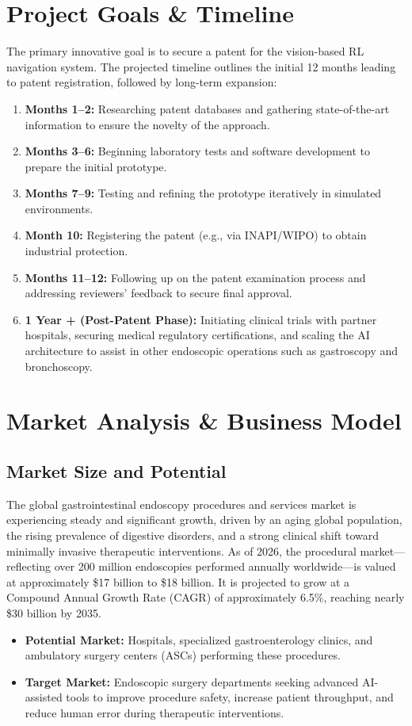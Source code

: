 \section{Project Goals \& Timeline}
The primary innovative goal is to secure a patent for the vision-based RL navigation system. The projected timeline outlines the initial 12 months leading to patent registration, followed by long-term expansion:
\begin{enumerate}
    \item \textbf{Months 1--2:} Researching patent databases and gathering state-of-the-art information to ensure the novelty of the approach.
    \item \textbf{Months 3--6:} Beginning laboratory tests and software development to prepare the initial prototype.
    \item \textbf{Months 7--9:} Testing and refining the prototype iteratively in simulated environments.
    \item \textbf{Month 10:} Registering the patent (e.g., via INAPI/WIPO) to obtain industrial protection.
    \item \textbf{Months 11--12:} Following up on the patent examination process and addressing reviewers' feedback to secure final approval.
    \item \textbf{1 Year + (Post-Patent Phase):} Initiating clinical trials with partner hospitals, securing medical regulatory certifications, and scaling the AI architecture to assist in other endoscopic operations such as gastroscopy and bronchoscopy.
\end{enumerate}

\section{Market Analysis \& Business Model}
\subsection{Market Size and Potential}
The global gastrointestinal endoscopy procedures and services market is experiencing steady and significant growth, driven by an aging global population, the rising prevalence of digestive disorders, and a strong clinical shift toward minimally invasive therapeutic interventions. As of 2026, the procedural market—reflecting over 200 million endoscopies performed annually worldwide—is valued at approximately \$17 billion to \$18 billion. It is projected to grow at a Compound Annual Growth Rate (CAGR) of approximately 6.5\%, reaching nearly \$30 billion by 2035. 
\begin{itemize}
    \item \textbf{Potential Market:} Hospitals, specialized gastroenterology clinics, and ambulatory surgery centers (ASCs) performing these procedures.
    \item \textbf{Target Market:} Endoscopic surgery departments seeking advanced AI-assisted tools to improve procedure safety, increase patient throughput, and reduce human error during therapeutic interventions.
\end{itemize}


